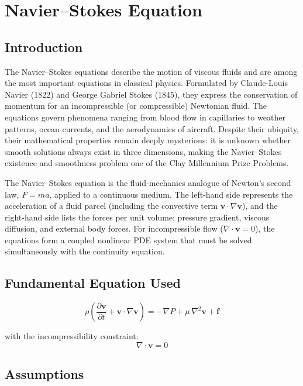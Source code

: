 \chapter{Navier--Stokes Equation}

\section*{Introduction}

The Navier--Stokes equations describe the motion of viscous fluids and are among the most important equations in classical physics. Formulated by Claude-Louis Navier (1822) and George Gabriel Stokes (1845), they express the conservation of momentum for an incompressible (or compressible) Newtonian fluid. The equations govern phenomena ranging from blood flow in capillaries to weather patterns, ocean currents, and the aerodynamics of aircraft. Despite their ubiquity, their mathematical properties remain deeply mysterious: it is unknown whether smooth solutions always exist in three dimensions, making the Navier--Stokes existence and smoothness problem one of the Clay Millennium Prize Problems.

The Navier--Stokes equation is the fluid-mechanics analogue of Newton's second law, $F = ma$, applied to a continuous medium. The left-hand side represents the acceleration of a fluid parcel (including the convective term $\mathbf{v}\cdot\nabla\mathbf{v}$), and the right-hand side lists the forces per unit volume: pressure gradient, viscous diffusion, and external body forces. For incompressible flow ($\nabla\cdot\mathbf{v} = 0$), the equations form a coupled nonlinear PDE system that must be solved simultaneously with the continuity equation.
\section*{Fundamental Equation Used}

\begin{equation}
\boxed{\;\rho\left(\frac{\partial \mathbf{v}}{\partial t} + \mathbf{v}\cdot\nabla\mathbf{v}\right) = -\nabla P + \mu\,\nabla^{2}\mathbf{v} + \mathbf{f}\;}
\label{eq:navier-stokes}
\end{equation}

with the incompressibility constraint:
\begin{equation}
\nabla\cdot\mathbf{v} = 0
\label{eq:continuity}
\end{equation}
\section*{Assumptions}

